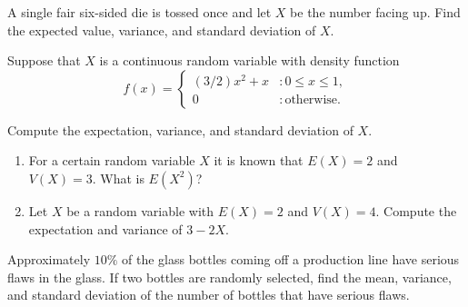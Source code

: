 \documentclass[12pt,reqno]{amsart}
\begin{document}
\bigskip
\prob A single fair six-sided die is tossed once and let $X$ be the number facing up. Find the expected value, variance, and standard deviation of $X$.\vfill





















\bigskip
\prob Suppose that $X$ is a continuous random variable with density function
    \[f(x) = \begin{cases}
        (3/2)x^2 + x & : 0\leq x \leq 1, \\
        0 & : \text{otherwise}.
    \end{cases}\]

Compute the expectation, variance, and standard deviation of $X$.\vfill














\newpage
\prob

\begin{enumerate}
    \item For a certain random variable $X$ it is known that $E(X)=2$ and $V(X) = 3$. What is $E(X^2)$?\vfill
    
   


    \item Let $X$ be a random variable with $E(X)=2$ and $V(X)=4$. Compute the expectation and variance of $3-2X$.\vfill
    

    
\end{enumerate}















\bigskip
\prob Approximately $10\%$ of the glass bottles coming off a production line have serious flaws in the glass. If two bottles are randomly selected, find the mean, variance, and standard deviation of the number of bottles that have serious flaws.\vfill
\end{document}
